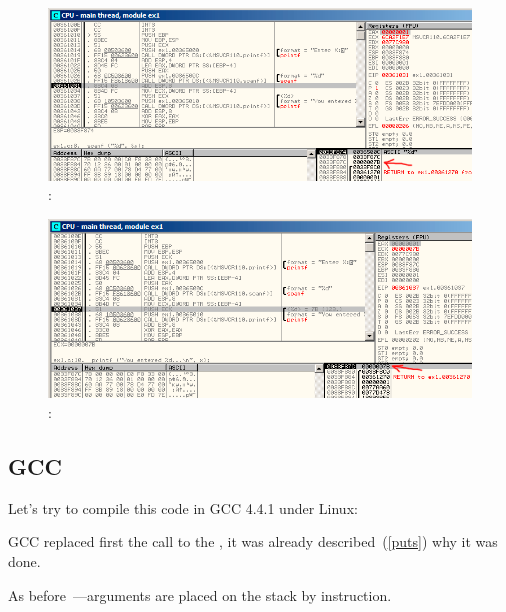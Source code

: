 \begin{figure}[H]
\centering
\includegraphics[scale=\FigScale]{patterns/04_scanf/ex1_olly_3.png}
\caption{\olly: \scanf {}}
\label{fig:scanf_ex1_olly_3}
\end{figure}

\begin{figure}[H]
\centering
\includegraphics[scale=\FigScale]{patterns/04_scanf/ex1_olly_4.png}
\caption{\olly:  \printf}
\label{fig:scanf_ex1_olly_4}
\end{figure}

\subsection{GCC}

{Let's try to compile this code in GCC 4.4.1 under Linux:}



{GCC replaced first the \printf call to the \puts, it was already described~(\ref{puts})
why it was done.}


{As before~---arguments are placed on the stack by \MOV instruction.}
